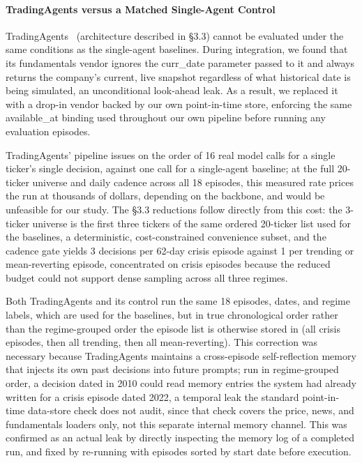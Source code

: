 \documentclass{article}
\begin{document}
\paragraph{TradingAgents versus a Matched Single-Agent Control} TradingAgents~\cite{xiao2024ta} (architecture described in \S3.3) cannot be evaluated under the same conditions as the single-agent baselines. During integration, we found that its fundamentals vendor ignores the curr\_date parameter passed to it and always returns the company's current, live snapshot regardless of what historical date is being simulated, an unconditional look-ahead leak. As a result, we replaced it with a drop-in vendor backed by our own point-in-time store, enforcing the same available\_at binding used throughout our own pipeline before running any evaluation episodes.

TradingAgents' pipeline issues on the order of 16 real model calls for a single ticker's single decision, against one call for a single-agent baseline; at the full 20-ticker universe and daily cadence across all 18 episodes, this measured rate prices the run at thousands of dollars, depending on the backbone, and would be unfeasible for our study. The \S3.3 reductions follow directly from this cost: the 3-ticker universe is the first three tickers of the same ordered 20-ticker list used for the baselines, a deterministic, cost-constrained convenience subset, and the cadence gate yields 3 decisions per 62-day crisis episode against 1 per trending or mean-reverting episode, concentrated on crisis episodes because the reduced budget could not support dense sampling across all three regimes.

Both TradingAgents and its control run the same 18 episodes, dates, and regime labels, which are used for the baselines, but in true chronological order rather than the regime-grouped order the episode list is otherwise stored in (all crisis episodes, then all trending, then all mean-reverting). This correction was necessary because TradingAgents maintains a cross-episode self-reflection memory that injects its own past decisions into future prompts; run in regime-grouped order, a decision dated in 2010 could read memory entries the system had already written for a crisis episode dated 2022, a temporal leak the standard point-in-time data-store check does not audit, since that check covers the price, news, and fundamentals loaders only, not this separate internal memory channel. This was confirmed as an actual leak by directly inspecting the memory log of a completed run, and fixed by re-running with episodes sorted by start date before execution.
\end{document}
